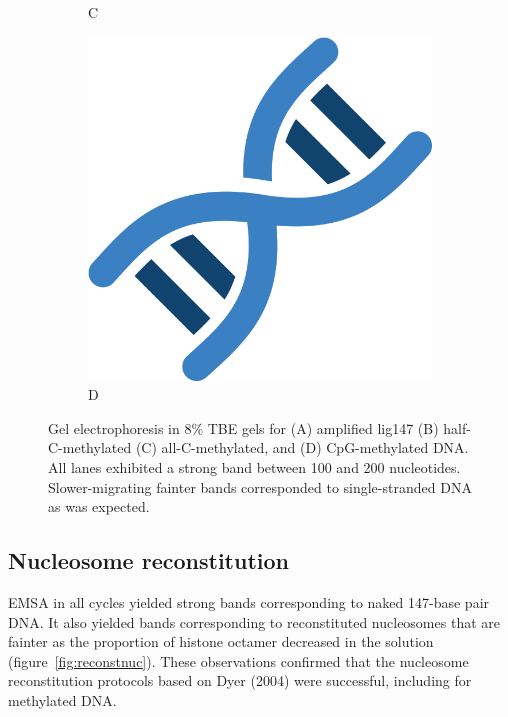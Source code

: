 \documentclass[parskip=full, numbers=noenddot]{scrreprt}
\begin{document}
\begin{figure}[htpb]
\begin{subfigure}[htpb]{0.4\textwidth}
    \caption{C}
    \label{fig:amplig_c}
  \end{subfigure}
  \begin{subfigure}[htpb]{0.4\textwidth}
    \centering
    \includegraphics[width=\textwidth]{test}
    \caption{D}
    \label{fig:amplig_d}
  \end{subfigure}
  \caption{Gel electrophoresis in 8\% TBE gels for (A) amplified lig147 (B) half-C-methylated (C) all-C-methylated, and (D) CpG-methylated DNA. All lanes exhibited a strong band between 100 and 200 nucleotides. Slower-migrating fainter bands corresponded to single-stranded DNA as was expected.}
  \label{fig:amplig}
\end{figure}

\subsection{Nucleosome reconstitution}
\label{ssec:reconstnuc}

EMSA in all cycles yielded strong bands corresponding to naked 147-base pair DNA. It also yielded bands corresponding to reconstituted nucleosomes that are fainter as the proportion of histone octamer decreased in the solution (figure~\ref{fig:reconstnuc}). These observations confirmed that the nucleosome reconstitution protocols based on Dyer (2004) were successful, including for methylated DNA.
\end{document}
